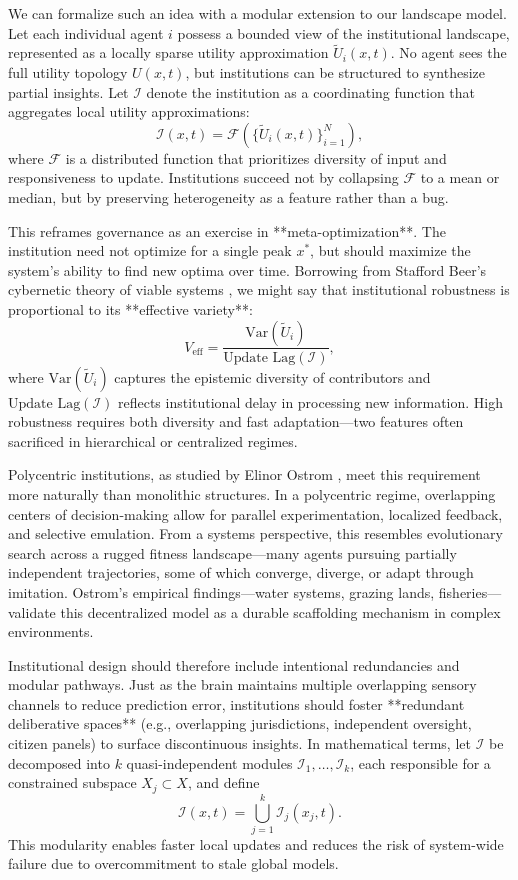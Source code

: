 \documentclass[12pt]{article}  %
\begin{document}
We can formalize such an idea with a modular extension to our landscape model. Let each individual agent \( i \) possess a bounded view of the institutional landscape, represented as a locally sparse utility approximation \( \tilde{U}_i(x, t) \). No agent sees the full utility topology \( U(x, t) \), but institutions can be structured to synthesize partial insights. Let \( \mathcal{I} \) denote the institution as a coordinating function that aggregates local utility approximations:
\[
\mathcal{I}(x, t) = \mathcal{F}(\{\tilde{U}_i(x, t)\}_{i=1}^N),
\]
where \( \mathcal{F} \) is a distributed function that prioritizes diversity of input and responsiveness to update. Institutions succeed not by collapsing \( \mathcal{F} \) to a mean or median, but by preserving heterogeneity as a feature rather than a bug.

This reframes governance as an exercise in **meta-optimization**. The institution need not optimize for a single peak \( x^* \), but should maximize the system’s ability to find new optima over time. Borrowing from Stafford Beer’s cybernetic theory of viable systems \parencite{beer1979heart}, we might say that institutional robustness is proportional to its **effective variety**:
\[
V_{\text{eff}} = \frac{\text{Var}(\tilde{U}_i)}{\text{Update Lag}(\mathcal{I})},
\]
where \( \text{Var}(\tilde{U}_i) \) captures the epistemic diversity of contributors and \( \text{Update Lag}(\mathcal{I}) \) reflects institutional delay in processing new information. High robustness requires both diversity and fast adaptation—two features often sacrificed in hierarchical or centralized regimes.

Polycentric institutions, as studied by Elinor Ostrom \parencite{ostrom1990governing}, meet this requirement more naturally than monolithic structures. In a polycentric regime, overlapping centers of decision-making allow for parallel experimentation, localized feedback, and selective emulation. From a systems perspective, this resembles evolutionary search across a rugged fitness landscape—many agents pursuing partially independent trajectories, some of which converge, diverge, or adapt through imitation. Ostrom’s empirical findings—water systems, grazing lands, fisheries—validate this decentralized model as a durable scaffolding mechanism in complex environments.

Institutional design should therefore include intentional redundancies and modular pathways. Just as the brain maintains multiple overlapping sensory channels to reduce prediction error, institutions should foster **redundant deliberative spaces** (e.g., overlapping jurisdictions, independent oversight, citizen panels) to surface discontinuous insights. In mathematical terms, let \( \mathcal{I} \) be decomposed into \( k \) quasi-independent modules \( \mathcal{I}_1, \dots, \mathcal{I}_k \), each responsible for a constrained subspace \( X_j \subset X \), and define
\[
\mathcal{I}(x, t) = \bigcup_{j=1}^{k} \mathcal{I}_j(x_j, t).
\]
This modularity enables faster local updates and reduces the risk of system-wide failure due to overcommitment to stale global models.
\end{document}
